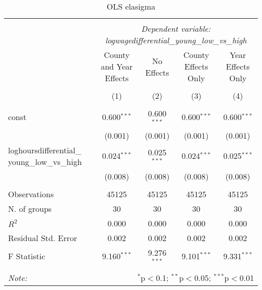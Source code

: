 \documentclass{report}
\begin{document}
\begin{table}[!htbp] \centering
  \caption{OLS elasigma}
\begin{tabular}{@{\extracolsep{5pt}}lcccc}
\\[-1.8ex]\hline
\hline \\[-1.8ex]
& \multicolumn{4}{c}{\textit{Dependent variable: logwagedifferential_young_low_vs_high}} \
\cr \cline{2-5}
\\[-1.8ex] & \multicolumn{1}{c}{County and Year Effects} & \multicolumn{1}{c}{No Effects} & \multicolumn{1}{c}{County Effects Only} & \multicolumn{1}{c}{Year Effects Only}  \\
\\[-1.8ex] & (1) & (2) & (3) & (4) \\
\hline \\[-1.8ex]
 const & 0.600$^{***}$ & 0.600$^{***}$ & 0.600$^{***}$ & 0.600$^{***}$ \\
& (0.001) & (0.001) & (0.001) & (0.001) \\
 loghoursdifferential_ young_low_vs_high & 0.024$^{***}$ & 0.025$^{***}$ & 0.024$^{***}$ & 0.025$^{***}$ \\
& (0.008) & (0.008) & (0.008) & (0.008) \\
\hline \\[-1.8ex]
 Observations & 45125 & 45125 & 45125 & 45125 \\
 N. of groups & 30 & 30 & 30 & 30 \\
 $R^2$ & 0.000 & 0.000 & 0.000 & 0.000 \\
 Residual Std. Error & 0.002 & 0.002 & 0.002 & 0.002 \\
 F Statistic & 9.160$^{***}$ & 9.276$^{***}$ & 9.101$^{***}$ & 9.331$^{***}$ \\
\hline
\hline \\[-1.8ex]
\textit{Note:} & \multicolumn{4}{r}{$^{*}$p$<$0.1; $^{**}$p$<$0.05; $^{***}$p$<$0.01} \\
\end{tabular}
\end{table}
\end{document}
